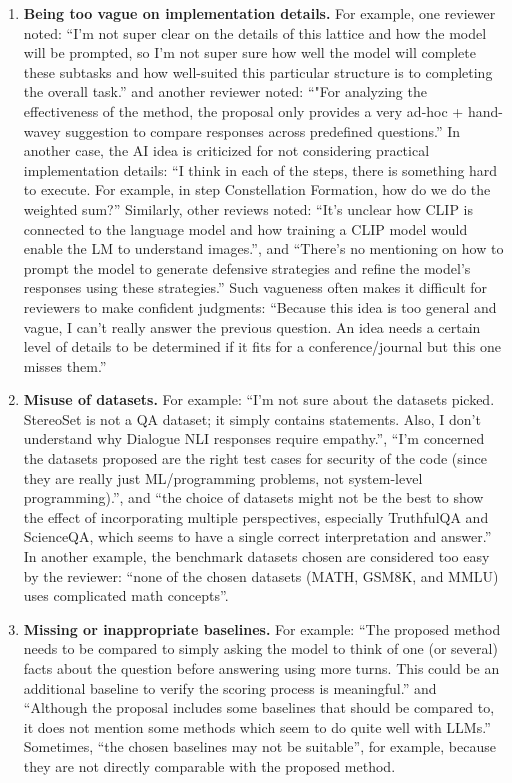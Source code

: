 \begin{enumerate}
    \item \textbf{Being too vague on implementation details.} For example, one reviewer noted: ``I'm not super clear on the details of this lattice and how the model will be prompted, so I'm not super sure how well the model will complete these subtasks and how well-suited this particular structure is to completing the overall task.'' and another reviewer noted: ``"For analyzing the effectiveness of the method, the proposal only provides a very ad-hoc + hand-wavey suggestion to compare responses across predefined questions.'' In another case, the AI idea is criticized for not considering practical implementation details: ``I think in each of the steps, there is something hard to execute. For example, in step Constellation Formation, how do we do the weighted sum?'' Similarly, other reviews noted: ``It's unclear how CLIP is connected to the language model and how training a CLIP model would enable the LM to understand images.'', and ``There's no mentioning on how to prompt the model to generate defensive strategies and refine the model's responses using these strategies.''
    Such vagueness often makes it difficult for reviewers to make confident judgments: ``Because this idea is too general and vague, I can't really answer the previous question. An idea needs a certain level of details to be determined if it fits for a conference/journal but this one misses them.''

    \item \textbf{Misuse of datasets.} For example: ``I'm not sure about the datasets picked. StereoSet is not a QA dataset; it simply contains statements. Also, I don't understand why Dialogue NLI responses require empathy.'', ``I'm concerned the datasets proposed are the right test cases for security of the code (since they are really just ML/programming problems, not system-level programming).'', and ``the choice of datasets might not be the best to show the effect of incorporating multiple perspectives, especially TruthfulQA  and ScienceQA, which seems to have a single correct interpretation and answer.''
    In another example, the benchmark datasets chosen are considered too easy by the reviewer: ``none of the chosen datasets (MATH, GSM8K, and MMLU) uses complicated math concepts''.

    \item \textbf{Missing or inappropriate baselines.} For example: ``The proposed method needs to be compared to simply asking the model to think of one (or several) facts about the question before answering using more turns. This could be an additional baseline to verify the scoring process is meaningful.'' and ``Although the proposal includes some baselines that should be compared to, it does not mention some methods which seem to do quite well with LLMs.'' Sometimes, ``the chosen baselines may not be suitable'', for example, because they are not directly comparable with the proposed method. 


\end{enumerate}
